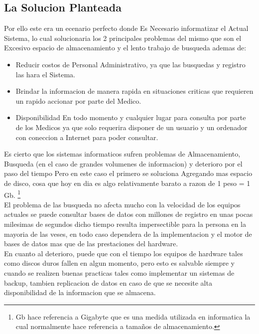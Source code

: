 \subsection{La Solucion Planteada}

Por ello este era un ecenario perfecto donde Es Necesario informatizar el
Actual Sistema, lo cual solucionaria los 2 principales problemas del mismo
que son el Excesivo espacio de almacenamiento y el lento trabajo de busqueda
ademas de:

\begin{itemize}
    \item Reducir costos de Personal Administrativo, ya que las busquedas y
    registro las hara el Sistema.
    \item Brindar la informacion de manera rapida en situaciones criticas que
    requieren un rapido accionar por parte del Medico.
   \item Disponibilidad En todo momento y cualquier lugar para consulta por
    parte de los Medicos ya que solo requerira disponer de un usuario y un
    ordenador con coneccion a Internet para poder consultar.
\end{itemize}

Es cierto que los sistemas informaticos sufren problemas de Almacenamiento, Busqueda
(en el caso de grandes volumenes de informacion) y deterioro por el paso del tiempo
Pero en este caso el primero se soluciona Agregando mas espacio de disco, cosa que
hoy en dia es algo relativamente barato a razon de 1 peso = 1 Gb. \footnote {Gb hace referencia a
Gigabyte que es una medida utilizada en informatica la cual normalmente hace referencia
a tamaños de almacenamiento.}  \\[0.1cm]

El problema de las busqueda no afecta mucho con la velocidad de los equipos
actuales se puede consultar bases de datos con millones de registro en unas
pocas milesimas de segundos dicho tiempo resulta impersectible para la persona
en la mayoria de las veses, en todo caso dependera de la implementacion y el
motor de bases de datos mas que de las prestaciones del hardware.\\[0.1cm]

En cuanto al deterioro, puede que con el tiempo los equipos de hardware
tales como discos duros fallen en algun momento, pero esto es salvable siempre y
cuando se realizen buenas practicas tales como implementar un sistemas de backup,
tambien replicacion de datos en caso de que se necesite alta disponibilidad de
la informacion que se almacena.\\[0.1cm]


